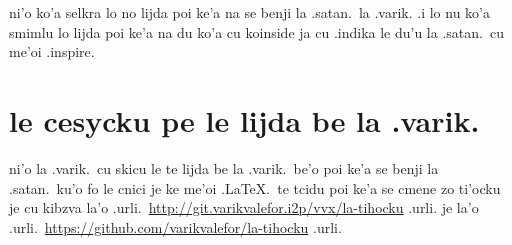 \documentclass{article}
\begin{document}
ni'o ko'a selkra lo no lijda poi ke'a na se benji la .satan.\ la .varik.  .i lo nu ko'a smimlu lo lijda poi ke'a na du ko'a cu koinside ja cu .indika le du'u la .satan.\ cu me'oi .inspire.

\section{le cesycku pe le lijda be la .varik.}
ni'o la .varik.\ cu skicu le te lijda be la .varik.\ be'o poi ke'a se benji la .satan.\ ku'o fo le cnici je ke me'oi .\LaTeX.\ te tcidu poi ke'a se cmene zo ti'ocku je cu kibzva la'o .urli.\ \url{http://git.varikvalefor.i2p/vvx/la-tihocku} .urli. je la'o .urli.\ \url{https://github.com/varikvalefor/la-tihocku} .urli.
\end{document}
